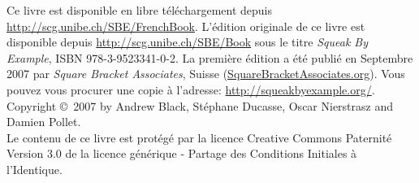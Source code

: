 \documentclass[a4paper,10pt,twoside]{book}
\begin{document}
\begin{footnotesize}
\setlength{\parindent}{0pt}
Ce livre est disponible en libre t\'el\'echargement depuis
\url{http://scg.unibe.ch/SBE/FrenchBook}. L'édition originale de ce livre est
disponible depuis \url{http://scg.unibe.ch/SBE/Book} sous le titre
\emph{Squeak By Example}, ISBN 978-3-9523341-0-2. La première édition
a été publié en Septembre 2007 par 
\emph{Square Bracket Associates}, Suisse
(\url{SquareBracketAssociates.org}). Vous pouvez vous procurer une
copie à l'adresse: \url{http://squeakbyexample.org/}.\\[1cm]

Copyright \copyright~2007 by Andrew Black, St\'ephane Ducasse, Oscar Nierstrasz and Damien Pollet.\\[1cm]

Le contenu de ce livre est prot\'eg\'e par la licence Creative Commons
Paternit\'e Version 3.0 de la licence g\'en\'erique - Partage des Conditions Initiales \`a l'Identique.


\end{footnotesize}
\end{document}
